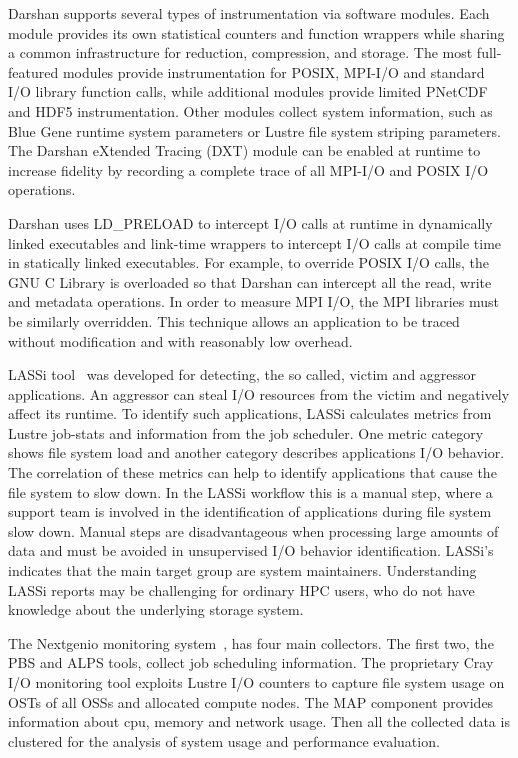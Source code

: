 \documentclass[]{llncs}
\begin{document}
Darshan supports several types of instrumentation via software modules.
Each module provides its own statistical counters and function wrappers while sharing a common infrastructure for reduction, compression, and storage.
The most full-featured modules provide instrumentation for POSIX, MPI-I/O and standard I/O library function calls, while additional modules provide limited PNetCDF and HDF5 instrumentation.
Other modules collect system information, such as Blue Gene runtime system parameters or Lustre file system striping parameters.
The Darshan eXtended Tracing (DXT) module can be enabled at runtime to increase fidelity by recording a complete trace of all MPI-I/O and POSIX I/O operations.

Darshan uses LD\_PRELOAD to intercept I/O calls at runtime in dynamically linked executables and link-time wrappers to intercept I/O calls at compile time in statically linked executables.
For example, to override POSIX I/O calls, the GNU C Library is overloaded so that Darshan can intercept all the read, write and metadata operations.
In order to measure MPI I/O, the MPI libraries must be similarly overridden.
This technique allows an application to be traced without modification and with reasonably low overhead.

LASSi tool~\cite{DBLP:journals/corr/abs-1906-03884} was developed for detecting, the so called, victim and aggressor applications.
An aggressor can steal I/O resources from the victim and negatively affect its runtime.
To identify such applications, LASSi calculates metrics from Lustre job-stats and information from the job scheduler.
One metric category shows file system load and another category describes applications I/O behavior.
The correlation of these metrics can help to identify applications that cause the file system to slow down.
In the LASSi workflow this is a manual step, where a support team is involved in the identification of applications during file system slow down.
Manual steps are disadvantageous when processing large amounts of data and must be avoided in unsupervised I/O behavior identification.
LASSi's indicates that the main target group are system maintainers.
Understanding LASSi reports may be challenging for ordinary HPC users, who do not have knowledge about the underlying storage system.

The Nextgenio monitoring system~\cite{nextgenio2016}, has four main collectors.
The first two, the PBS and ALPS tools, collect job scheduling information.
The proprietary Cray I/O monitoring tool exploits Lustre I/O counters to capture file system usage on OSTs of all OSSs and allocated compute nodes.
The MAP component provides information about cpu, memory and network usage.
Then all the collected data is clustered for the analysis of system usage and performance evaluation.
\end{document}
